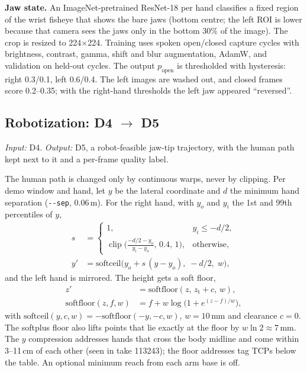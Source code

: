 \documentclass[conference,10pt]{IEEEtran}
\newcommand{\mm}{\,mm\xspace}
\DeclareMathOperator{\clip}{clip}
\begin{document}
\textbf{Jaw state.} An ImageNet-pretrained ResNet-18 per hand classifies a fixed region of the wrist fisheye that shows the
bare jaws (bottom centre; the left ROI is lower because that camera sees the jaws only in the bottom 30\% of the image).
The crop is resized to 224$\times$224. Training uses spoken open/closed capture cycles with brightness, contrast, gamma,
shift and blur augmentation, AdamW, and validation on held-out cycles. The output $p_\mathrm{open}$ is thresholded with
hysteresis: right 0.3/0.1, left 0.6/0.4. The left images are washed out, and closed frames score 0.2--0.35; with the
right-hand thresholds the left jaw appeared ``reversed''.

\subsection{Robotization: D4 $\to$ D5}\label{sec:robotize}
\emph{Input:} D4. \emph{Output:} D5, a robot-feasible jaw-tip trajectory, with the human path kept next to it and a
per-frame quality label.
\par\noindent{}\par

The human path is changed only by continuous warps, never by clipping. Per demo window and hand, let $y$ be the lateral
coordinate and $d$ the minimum hand separation (\texttt{-{}-sep}, 0.06\,m). For the right hand, with $y_o$ and $y_i$ the
1st and 99th percentiles of $y$,
\begin{align}
s&=\begin{cases}1, & y_i\le -d/2,\\ \clip\!\big(\tfrac{-d/2-y_o}{y_i-y_o},\,0.4,\,1\big), & \text{otherwise,}\end{cases}\\
y'&=\mathrm{softceil}\big(y_o+s\,(y-y_o),\;-d/2,\;w\big),
\end{align}
and the left hand is mirrored. The height gets a soft floor,
\begin{align}
z'&=\mathrm{softfloor}(z,\,z_\mathrm{t}+c,\,w),\\
\mathrm{softfloor}(z,f,w)&=f+w\log\!\big(1+e^{(z-f)/w}\big),
\end{align}
with $\mathrm{softceil}(y,c,w)=-\mathrm{softfloor}(-y,-c,w)$, $w=10$\mm and clearance $c=0$. The softplus floor also lifts
points that lie exactly at the floor by $w\ln2\approx7$\mm. The $y$ compression addresses hands that cross the body
midline and come within 3--11\,cm of each other (seen in take 113243); the floor addresses tag TCPs below the table. An
optional minimum reach from each arm base is off.
\end{document}
